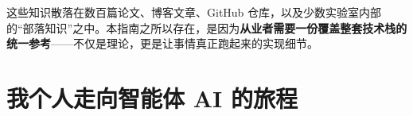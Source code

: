 \documentclass[11pt,a4paper,openany]{book}
\begin{document}
这些知识散落在数百篇论文、博客文章、GitHub 仓库，以及少数实验室内部的“部落知识”之中。本指南之所以存在，是因为\textbf{从业者需要一份覆盖整套技术栈的统一参考}——不仅是理论，更是让事情真正跑起来的实现细节。

\section*{我个人走向智能体 AI 的旅程}
\label{a-personal-journey-to-agentic-ai}

\end{document}

